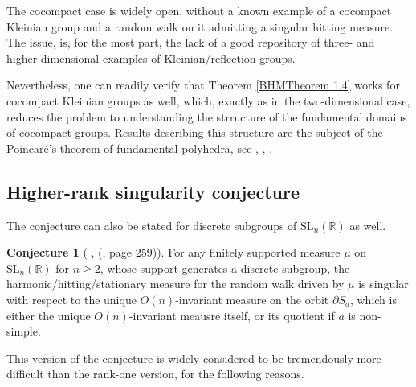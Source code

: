 \documentclass[11pt]{amsart}
\theoremstyle{definition}
\newtheorem{conjecture}{Conjecture}[section]
\begin{document}
	The cocompact case is widely open, without a known example of a cocompact Kleinian group and a random walk on it admitting a singular hitting measure. The issue, is, for the most part, the lack of a good repository of three- and higher-dimensional examples of Kleinian/reflection groups.
	
	Nevertheless, one can readily verify that Theorem \ref{BHMTheorem 1.4} works for cocompact Kleinian groups as well, which, exactly as in the two-dimensional case, reduces the problem to understanding the strructure of the fundamental domains of cocompact groups. Results describing this structure are the subject of the Poincar\'e's theorem of fundamental polyhedra, see \cite{Epstein1994AnEO}, \cite{ananin_grossi_2011}, \cite{JESPERS2015401}.
	\subsection{Higher-rank singularity conjecture}
	
	The conjecture can also be stated for discrete subgroups of $\text{SL}_n(\mathbb{R})$ as well.
	
	\begin{conjecture}[ \cite{MR2568439}, (\cite{kaimanovich2011matrix}, page 259)]
		\label{Higher rank singularity conjecture}
		For any finitely supported measure $\mu$ on $\text{SL}_n(\mathbb{R})$ for $n \ge 2$, whose support generates a discrete subgroup, the harmonic/hitting/stationary measure for the random walk driven by $\mu$ is singular with respect to the unique $O(n)$-invariant measure on the orbit $\partial S_a$, which is either the unique $O(n)$-invariant meausre itself, or its quotient if $a$ is non-simple.
	\end{conjecture}
	
	This version of the conjecture is widely considered to be tremendously more difficult than the rank-one version, for the following reasons.
	
\end{document}
